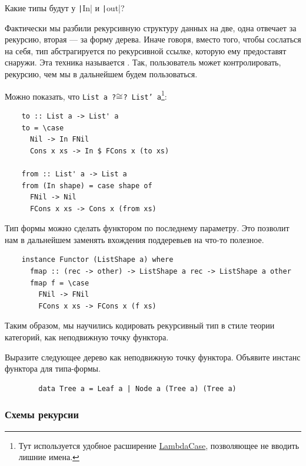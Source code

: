 \begin{task}
    Какие типы будут у \texttt|In| и \texttt|out|?
\end{task}

Фактически мы разбили рекурсивную структуру данных на две, одна отвечает за рекурсию, вторая --- за форму дерева.
Иначе говоря, вместо того, чтобы сослаться на себя, тип абстрагируется по рекурсивной ссылке, которую ему предоставят снаружи.
Эта техника называется .
Так, пользователь может контролировать, рекурсию, чем мы в дальнейшем будем пользоваться.

Можно показать, что \texttt{List a ?$\cong$? List' a}\footnote{Тут используется удобное расширение \href{https://downloads.haskell.org/~ghc/9.0.1/docs/html/users_guide/exts/lambda_case.html}{LambdaCase}, позволяющее не вводить лишние имена.}:
\begin{verbatim}
    to :: List a -> List' a
    to = \case
      Nil -> In FNil
      Cons x xs -> In $ FCons x (to xs)

    from :: List' a -> List a
    from (In shape) = case shape of
      FNil -> Nil
      FCons x xs -> Cons x (from xs)
\end{verbatim}

Тип формы можно сделать функтором по последнему параметру.
Это позволит нам в дальнейшем заменять вхождения поддеревьев на что-то полезное.
\begin{verbatim}
    instance Functor (ListShape a) where
      fmap :: (rec -> other) -> ListShape a rec -> ListShape a other
      fmap f = \case
        FNil -> FNil
        FCons x xs -> FCons x (f xs)
\end{verbatim}

Таким образом, мы научились кодировать рекурсивный тип в стиле теории категорий, как неподвижную точку функтора.

\begin{task}
    Выразите следующее дерево как неподвижную точку функтора.
    Объявите инстанс функтора для типа-формы.
    \begin{verbatim}
        data Tree a = Leaf a | Node a (Tree a) (Tree a)
    \end{verbatim}
\end{task}

\subsubsection{Схемы рекурсии} \label{subsubsec:recursion-schemas}

